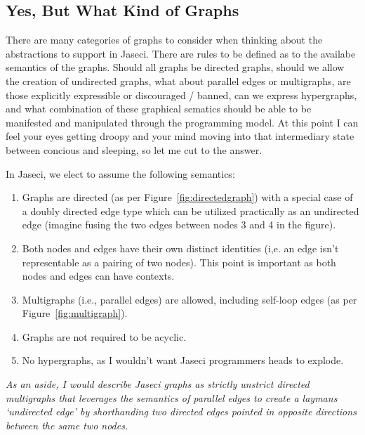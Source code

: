 \documentclass{book}
\begin{document}
\subsection{Yes, But What Kind of Graphs}

There are many categories of graphs to consider when thinking about the abstractions to support in Jaseci. There are rules to be defined as to the availabe semantics of the graphs. Should all graphs be \gls{directed graphs}, should we allow the creation of \gls{undirected graphs}, what about parallel edges or \gls{multigraphs}, are those explicitly expressible or discouraged / banned, can we express \gls{hypergraphs}, and what combination of these graphical sematics should be able to be manifested and manipulated through the programming model. At this point I can feel your eyes getting droopy and your mind moving into that intermediary state between concious and sleeping, so let me cut to the answer.
\par
\printfigGraphTypes
In Jaseci, we elect to assume the following semantics:
\begin{enumerate}
    \item Graphs are directed (as per Figure~\ref{fig:directedgraph}) with a special case of a doubly directed edge type which can be utilized practically as an undirected edge (imagine fusing the two edges between nodes 3 and 4 in the figure).
    \item Both nodes and edges have their own distinct identities (i,e. an edge isn't representable as a pairing of two nodes). This point is important as both nodes and edges can have \gls{contexts}.
    \item Multigraphs (i.e., parallel edges) are allowed, including self-loop edges (as per Figure~\ref{fig:multigraph}).
    \item Graphs are not required to be acyclic.
    \item No hypergraphs, as I wouldn't want Jaseci programmers heads to explode.

\end{enumerate}
\emph{As an aside, I would describe Jaseci graphs as strictly unstrict directed multigraphs that leverages the semantics of parallel edges to create a laymans `undirected edge' by shorthanding two directed edges pointed in opposite directions between the same two nodes.}
\end{document}
